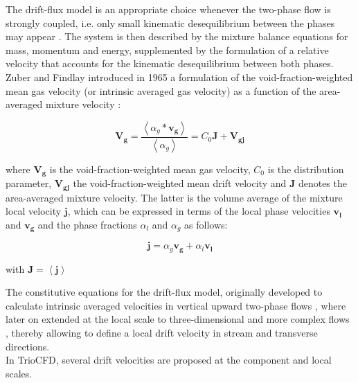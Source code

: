 The drift-flux model is an appropriate choice whenever the two-phase flow is strongly coupled, i.e. only small kinematic desequilibrium between the phases may appear \cite{hibiki2002distribution}. The system is then described by the mixture balance equations for mass, momentum and energy, supplemented by the formulation of a relative velocity that accounts for the kinematic desequilibrium between both phases. \\

Zuber and Findlay \cite{zuber1965average} introduced in 1965 a formulation of the void-fraction-weighted mean gas velocity (or intrinsic averaged gas velocity) as a function of the area-averaged mixture velocity : 

	\begin{equation}\label{eq_drift-velocity}
		\mathbf{V_g} = \frac{\left\langle\alpha_g * \mathbf{v_g}\right\rangle}{\left\langle\alpha_g\right\rangle} = C_0 \mathbf{J} + \mathbf{V_{gj}} 
	\end{equation}
	
	
where $\mathbf{V_g}$ is the void-fraction-weighted mean gas velocity, $C_0$ is the distribution parameter, $\mathbf{V_{gj}}$ the void-fraction-weighted mean drift velocity and $\mathbf{J}$ denotes the area-averaged mixture velocity. The latter is the volume average of the mixture local velocity $\mathbf{j}$, which can be expressed in terms of the local phase velocities $\mathbf{v_l}$ and $\mathbf{v_g}$ and the phase fractions $\alpha_l$ and $\alpha_g$ as follows:%
	
	\begin{equation}
		\mathbf{j} = \alpha_g \mathbf{v_g} + \alpha_l \mathbf{v_l}
	\end{equation}
	
with $\mathbf{J} = \left\langle \mathbf{j} \right\rangle $ 


The constitutive equations for the drift-flux model, originally developed to calculate intrinsic averaged velocities in vertical upward two-phase flows \cite{zuber1965average}\cite{ishii1977one}, where later on extended at the local scale to three-dimensional and more complex flows \cite{manninen1996mixture}\cite{mahdavi2017implementation}, thereby allowing to define a local drift velocity in stream and transverse directions.\\

In TrioCFD, several drift velocities are proposed at the component and local scales. 


